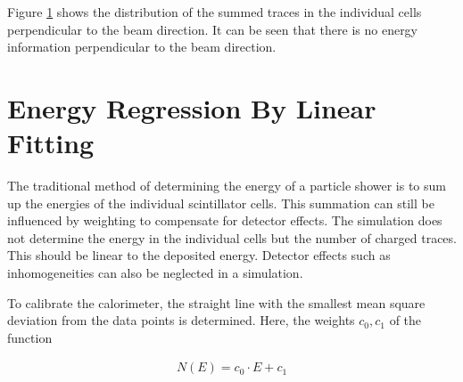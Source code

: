 \documentclass[12pt, a4paper]{thesis}
\begin{document}
\begin{figure}[H]%
    \centering
    \qquad
    \caption{}%
    \label{fig:y-distri}%
\end{figure}

Figure \ref{fig:y-distri} shows the distribution of the summed traces
in the individual cells perpendicular to the beam direction. It can be
seen that there is no energy information perpendicular to the beam
direction.

\section{Energy Regression By Linear Fitting}
\label{sec:orgd10286d}

The traditional method of determining the energy of a particle shower
is to sum up the energies of the individual scintillator cells. This
summation can still be influenced by weighting to compensate for
detector effects. The simulation does not determine the energy in the
individual cells but the number of charged traces. This should be
linear to the deposited energy. Detector effects such as
inhomogeneities can also be neglected in a simulation.

To calibrate the calorimeter, the straight line with the smallest mean
square deviation from the data points is determined. Here, the weights
\(c_0, c_1\) of the function

\begin{align}
N(E) = c_0 \cdot E + c_1
\end{align}
\end{document}
